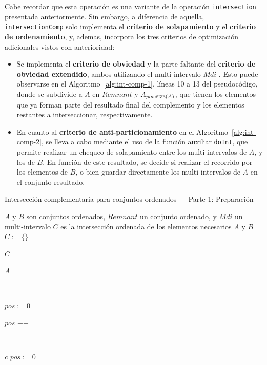 Cabe recordar que esta operación es una variante de la operación \texttt{intersection} presentada anteriormente. Sin embargo, a diferencia de aquella, \texttt{intersectionComp} solo implementa el \textbf{criterio de solapamiento} y el \textbf{criterio de ordenamiento}, y, ademas, incorpora los tres criterios de optimización adicionales vistos con anterioridad:

\begin{itemize}
    \item Se implementa el \textbf{criterio de obviedad} y la parte faltante del \textbf{criterio de obviedad extendido}, ambos utilizando el multi-intervalo $Mdi$ . Esto puede observarse en el Algoritmo~\ref{alg:int-comp-1}, líneas 10 a 13 del pseudocódigo, donde se subdivide a $A$ en $Remnant$ y $A_{pos:\Call{size}{A}}$, que tienen los elementos que ya forman parte del resultado final del complemento y los elementos restantes a interseccionar, respectivamente.

    \item En cuanto al \textbf{criterio de anti-particionamiento} en el Algoritmo~\ref{alg:int-comp-2}, se lleva a cabo mediante el uso de la función auxiliar \texttt{doInt}, que permite realizar un chequeo de solapamiento entre los multi-intervalos de $A$, y los de $B$. En función de este resultado, se decide si realizar el recorrido por los elementos de $B$, o bien guardar directamente los multi-intervalos de $A$ en el conjunto resultado.
\end{itemize}

\begin{algorithm}
\caption{Intersección complementaria para conjuntos ordenados — Parte 1: Preparación}
\label{alg:int-comp-1}
\begin{algorithmic}[1]
\Require $A$ y $B$ son conjuntos ordenados, $Remnant$ un conjunto ordenado, y $Mdi$ un multi-intervalo
\Ensure $C$ es la intersección ordenada de los elementos necesarios $A$ y $B$
    \State $C := \{\}$
    
        \State \Return $C$
    \EndIf

        \State \Return $A$
    \EndIf

    \ 
    
    \State $pos := 0$
    
        \State {}
        \State $pos$ \!+\!+
    \EndWhile

    
    \ 
    
    \State $c\_pos := 0$
\EndFunction
\end{algorithmic}
\end{algorithm}


